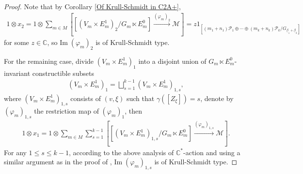 \documentclass[12pt]{amsart}
\theoremstyle{definition}
\numberwithin{equation}{section}
\begin{document}
\begin{proof}
    Note that by Corollary \ref{Of Krull-Schmidt in C2A+}, 
    \begin{align*}
        1 \otimes x_2 =1 \otimes \sum_{m \in M}[[(V_m \times E_m^1)_2/G_m \ltimes E_m^0] \xrightarrow{(\varphi_m)_2} \mathcal{M}] = z  1_{[(m_1+n_1) \mathcal{P}_1 \oplus \cdots \oplus (m_k+n_k) \mathcal{P}_k/G_{\underline{\beta}_1+\underline{\beta}_2}]}
    \end{align*}
    for some $ z \in \mathbb{C} $, so $  \mathrm{Im}\;(\varphi_m)_2 $ is of Krull-Schmidt type.

    For the remaining case, divide $ (V_m \times E_m^1)_1 $ into a disjoint union of $ G_m \ltimes E_m^0 $-invariant constructible subsets
    \begin{align*}
        (V_m \times E_m^1)_1 = \bigsqcup_{s=1}^{k-1} (V_m \times E_m^1)_{1,s},
    \end{align*}
    where $ (V_m \times E_m^1)_{1,s} $ consists of $ (v,\xi) $ such that $ \gamma([Z_{\xi}]) = s $, denote by $ (\varphi_m)_{1,s} $ the restriction map of $ (\varphi_m)_{1} $, then
    \begin{align*}
      1 \otimes x_1 =  1 \otimes \sum_{m \in M} \sum_{s=1}^{k-1}[[(V_m \times E_m^1)_{1,s }/G_m \ltimes E_m^0] \xrightarrow{(\varphi_m)_{1,s}}\mathcal{M}].
    \end{align*}
    For any $ 1 \leqslant s \leqslant k-1 $, according to the above analysis of $ \mathbb{C}^* $-action and using a similar argument as in the proof of \cite[Proposition 11]{DXX10}, $ \mathrm{Im}\;(\varphi_m)_{1,s} $ is of Krull-Schmidt type.

\end{proof}
\end{document}
